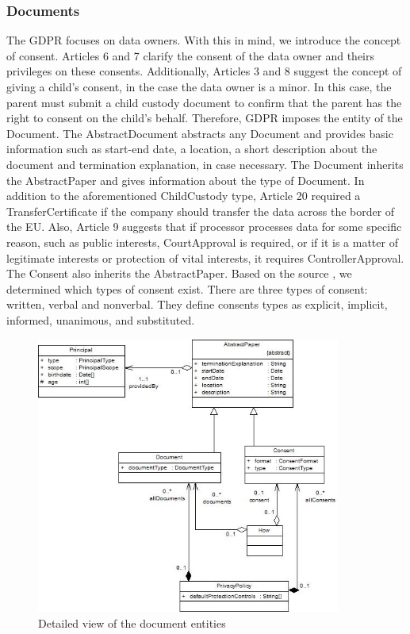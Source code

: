 \documentclass[11pt,english]{article}
\begin{document}
\subsubsection{Documents}
The GDPR focuses on data owners. With this in mind, we introduce the concept of consent. Articles 6 and 7 clarify the consent of the data owner and theirs privileges on these consents. Additionally, Articles 3 and 8 suggest the concept of giving a child's consent, in the case the data owner is a minor. In this case, the parent must submit a child custody document to confirm that the parent has the right to consent on the child's behalf. Therefore, GDPR imposes the entity of the Document. \newline The AbstractDocument abstracts any Document and provides basic information such as start-end date,  a location, a short description about the document and termination explanation, in case necessary. \newline  The Document inherits the AbstractPaper and gives information about the type of Document. In addition to the aforementioned ChildCustody type, Article 20 required a TransferCertificate if the company should transfer the data across the border of the EU. Also, Article 9 suggests that if processor processes data for some specific reason, such as public interests, CourtApproval is required, or if it is a matter of legitimate interests or protection of vital interests, it requires ControllerApproval. \newline The Consent also inherits the AbstractPaper. Based on the source \cite{consent}, we determined which types of consent exist. There are three types of consent: written, verbal and nonverbal. They define consents types as explicit, implicit, informed, unanimous, and substituted.
\begin{figure}[H]
    \centering
    \includegraphics[width=10cm,scale=0.5]{images/document.jpg}
    \caption{Detailed view of the document entities}
    \label{fig:Document}
\end{figure}
\end{document}
